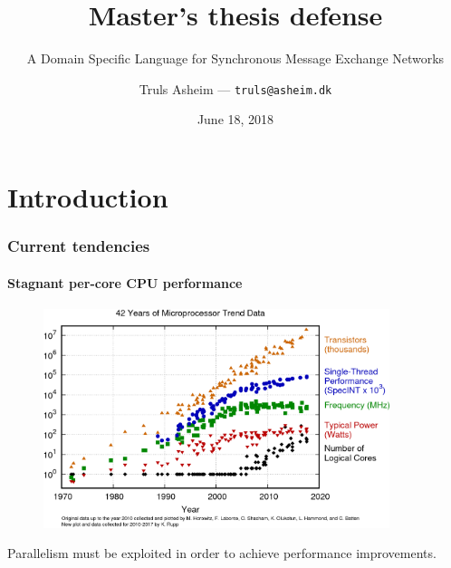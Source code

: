 \documentclass{beamer}
\title{Master's thesis defense}
\subtitle{A Domain Specific Language for Synchronous Message \mbox{Exchange} Networks}
\author{Truls Asheim --- \texttt{truls@asheim.dk}}
\institute{Niels Bohr Institute, University of Copenhagen}
\date{June 18, 2018}
\begin{document}
\maketitle

\section{Introduction}


\begin{frame}
  \frametitle{Current tendencies}
  \framesubtitle{Stagnant per-core CPU performance}
    \begin{figure}
      \centering
      \includegraphics[width=0.9\textwidth]{figures/42-years-processor-trend.png}
    \end{figure}
    Parallelism must be exploited in order to achieve performance
    improvements.
  \end{frame}
\end{document}
